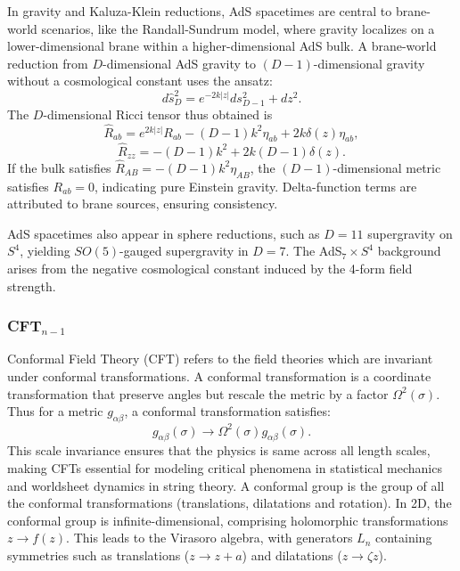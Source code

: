 In gravity and Kaluza-Klein reductions, AdS spacetimes are central to brane-world scenarios, like the Randall-Sundrum model, where gravity localizes on a lower-dimensional brane within a higher-dimensional AdS bulk. A brane-world reduction from $D$-dimensional AdS gravity to $(D-1)$-dimensional gravity without a cosmological constant uses the ansatz:
\[
d\hat{s}_D^2 = e^{-2k|z|} ds_{D-1}^2 + dz^2.
\]
The $D$-dimensional Ricci tensor thus obtained is
\[
\hat{R}_{ab} = e^{2k|z|} R_{ab} - (D-1) k^2 \eta_{ab} + 2k \delta(z) \eta_{ab},
\]
\[
\hat{R}_{zz} = - (D-1) k^2 + 2k (D-1) \delta(z).
\]
If the bulk satisfies $\hat{R}_{AB} = - (D-1) k^2 \eta_{AB}$, the $(D-1)$-dimensional metric satisfies $R_{ab} = 0$, indicating pure Einstein gravity. Delta-function terms are attributed to brane sources, ensuring consistency.

AdS spacetimes also appear in sphere reductions, such as $D=11$ supergravity on $S^4$, yielding $SO(5)$-gauged supergravity in $D=7$. The AdS$_7 \times S^4$ background arises from the negative cosmological constant induced by the 4-form field strength. 


\subsubsection{CFT$_{n-1}$}

Conformal Field Theory (CFT) refers to the field theories which are invariant under conformal transformations. A conformal transformation is a coordinate transformation that preserve angles but rescale the metric by a factor $\Omega^2(\sigma)$. Thus for a metric $g_{\alpha\beta}$, a conformal transformation satisfies:
\begin{equation}
g_{\alpha\beta}(\sigma) \to \Omega^2(\sigma) g_{\alpha\beta}(\sigma).
\end{equation}
This scale invariance ensures that the physics is same across all length scales, making CFTs essential for modeling critical phenomena in statistical mechanics and worldsheet dynamics in string theory. A conformal group is the group of all the conformal transformations (translations, dilatations and rotation). In 2D, the conformal group is infinite-dimensional, comprising holomorphic transformations $z \to f(z)$. This leads to the Virasoro algebra, with generators $L_n$ containing symmetries such as translations ($z \to z + a$) and dilatations ($z \to \zeta z$).

